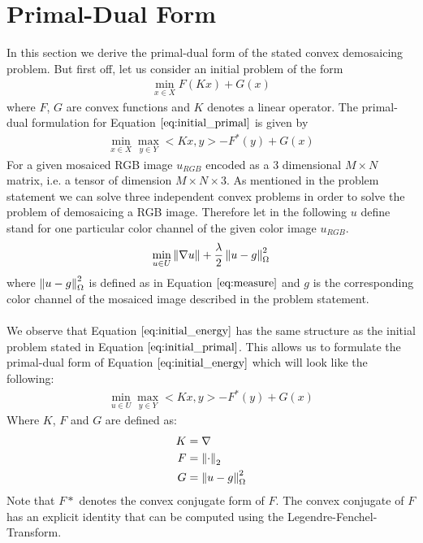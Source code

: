 \section{Primal-Dual Form}
\label{sec:primal_dual_form}
In this section we derive the primal-dual form of the stated convex demosaicing problem. But first off, let us consider an initial problem of the form 
\begin{align}
	\min_{x \in X} F(K x) + G(x)
\label{eq:initial_primal}	
\end{align}
where $F$, $G$ are convex functions and $K$ denotes a linear operator. The primal-dual formulation for Equation $\ref{eq:initial_primal}$ is given by 
\begin{align}
	\min_{x \in X} \max_{y \in Y} < Kx, y > - F^*(y) + G(x)
\label{eq:initial_primal_dual}	
\end{align}
For a given mosaiced RGB image $u_{RGB}$ encoded as a 3 dimensional $M \times N$ matrix, i.e. a tensor of dimension $M \times N \times 3$. As mentioned in the problem statement we can solve three independent convex problems in order to solve the problem of demosaicing a RGB image. Therefore let in the following $u$ define stand for one particular color channel of the given color image $u_{RGB}$.
\begin{equation}
\min_{u \in U} \left\lVert\nabla u\right\rVert + \frac{\lambda}{2} \left\lVert u - g\right\rVert^2_{\Omega}
\label{eq:initial_energy}
\end{equation}
where $\left\lVert u - g\right\rVert^2_{\Omega}$ is defined as in Equation $\ref{eq:measure}$ and $g$ is the corresponding color channel of the mosaiced image described in the problem statement. \\ \\
We observe that Equation $\ref{eq:initial_energy}$ has the same structure as the initial problem stated in Equation $\ref{eq:initial_primal}$. This allows us to formulate the primal-dual form of Equation $\ref{eq:initial_energy}$ which will look like the following:
\begin{align}
	\min_{u \in U} \max_{y \in Y} < Kx, y > - F^*(y) + G(x)
\label{eq:initial_primal_dual}	
\end{align}
Where $K$, $F$ and $G$ are defined as:
\begin{align}
	K &= \nabla \nonumber \\
	F &= \left\lVert\cdot\right\rVert_2 \nonumber \\
	G &= \left\lVert u - g\right\rVert^2_{\Omega}
\label{eq:def_kfg}	
\end{align}
Note that $F*$ denotes the convex conjugate form of $F$. The convex conjugate of $F$ has an explicit identity that can be computed using the Legendre-Fenchel-Transform.
